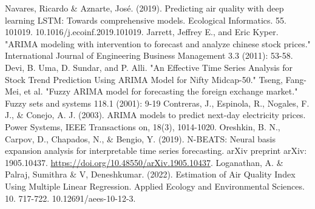 \documentclass[conference]{IEEEtran}
\begin{document}
\begin{thebibliography}{00}
     Navares, Ricardo \& Aznarte, José. (2019). Predicting air quality with deep learning LSTM: Towards comprehensive models. Ecological Informatics. 55. 101019. 10.1016/j.ecoinf.2019.101019.
     Jarrett, Jeffrey E., and Eric Kyper. "ARIMA modeling with intervention to forecast and analyze chinese stock prices." International Journal of Engineering Business Management 3.3 (2011): 53-58.
     Devi, B. Uma, D. Sundar, and P. Alli. "An Effective Time Series Analysis for Stock Trend Prediction Using ARIMA Model for Nifty Midcap-50."
     Tseng, Fang-Mei, et al. "Fuzzy ARIMA model for forecasting the foreign exchange market." Fuzzy sets and systems 118.1 (2001): 9-19
     Contreras, J., Espinola, R., Nogales, F. J., \& Conejo, A. J. (2003). ARIMA models to predict next-day electricity prices. Power Systems, IEEE Transactions on, 18(3), 1014-1020.
     Oreshkin, B. N., Carpov, D., Chapados, N., \& Bengio, Y. (2019). N-BEATS: Neural basis expansion analysis for interpretable time series forecasting. arXiv preprint arXiv: 1905.10437. \url{https://doi.org/10.48550/arXiv.1905.10437}.
     Loganathan, A. \& Palraj, Sumithra \& V, Deneshkumar. (2022). Estimation of Air Quality Index Using Multiple Linear Regression. Applied Ecology and Environmental Sciences. 10. 717-722. 10.12691/aees-10-12-3.
\end{thebibliography}
\end{document}
